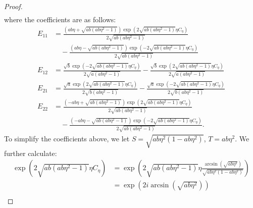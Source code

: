 \documentclass[10pt,a4paper]{amsart}
\begin{document}
\begin{proof}
\begin{align}
\end{align}
where the coefficients are as follows:
\begin{subequations}
    \begin{align}
        E_{11} &= \frac{\left(ab\eta+\sqrt{ab(ab\eta^2-1)}\right) \exp\left(2\sqrt{ab(ab\eta^2-1)}\eta C_\eta\right)}{2\sqrt{ab(ab\eta^2-1)}}\nonumber\\ &\quad -
        \frac{\left(ab\eta-\sqrt{ab(ab\eta^2-1)}\right) \exp\left(-2\sqrt{ab(ab\eta^2-1)}\eta C_\eta\right)}{2\sqrt{ab(ab\eta^2-1)}} \nonumber \\
        E_{12} &= \frac{\sqrt{b} \exp\left(-2\sqrt{ab(ab\eta^2-1)}\eta C_\eta\right)}{2\sqrt{a(ab\eta^2-1)}}-
        \frac{\sqrt{b} \exp\left(2\sqrt{ab(ab\eta^2-1)}\eta C_\eta\right)}{2\sqrt{a(ab\eta^2-1)}}\nonumber \\
        E_{21} &= \frac{\sqrt{a} \exp\left(2\sqrt{ab(ab\eta^2-1)}\eta C_\eta\right)}{2\sqrt{b(ab\eta^2-1)}}-
        \frac{\sqrt{a} \exp\left(-2\sqrt{ab(ab\eta^2-1)}\eta C_\eta\right)}{2\sqrt{b(ab\eta^2-1)}}\nonumber \\
        E_{22} &= \frac{\left(-ab\eta+\sqrt{ab(ab\eta^2-1)}\right) \exp\left(2\sqrt{ab(ab\eta^2-1)}\eta C_\eta\right)}{2\sqrt{ab(ab\eta^2-1)}}\nonumber\\ &\quad -
        \frac{\left(-ab\eta-\sqrt{ab(ab\eta^2-1)}\right) \exp\left(-2\sqrt{ab(ab\eta^2-1)}\eta C_\eta\right)}{2\sqrt{ab(ab\eta^2-1)}}\nonumber.
    \end{align}\label{E.Trial_coefficients}
\end{subequations}
To simplify the coefficients above, we let $S=\sqrt{ab\eta^2(1-ab\eta^2)}$, $T=ab\eta^2$. We further calculate:
\begin{align}
    \exp\left(2\sqrt{ab(ab\eta^2-1)}\eta C_\eta\right) &= \exp\left(2\sqrt{ab(ab\eta^2-1)}\eta \frac{\arcsin(\sqrt{ab\eta^2})}{\sqrt{ab\eta^2(1-ab\eta^2)}}\right) \nonumber \\
    &= \exp\left(2i \arcsin\left(\sqrt{ab\eta^2}\right)\right) \nonumber \\

\end{align}
\end{proof}
\end{document}
